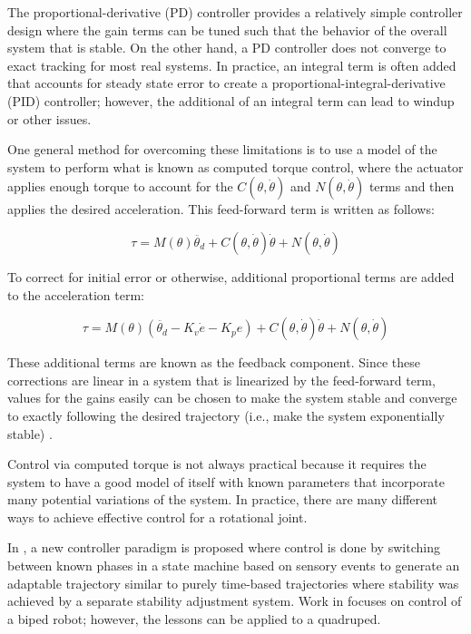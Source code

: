 The proportional-derivative (PD) controller provides a relatively simple controller design where the gain terms can be tuned such that the behavior of the overall system that is stable. On the other hand, a PD controller does not converge to
exact tracking for most real systems. In practice, an integral term is often added that accounts for steady state error to create a proportional-integral-derivative (PID) controller; however, the additional of an integral term can lead to windup or other issues.

One general method for overcoming these limitations is to use a model of the 
system to perform what is known as computed torque control, where the actuator
applies enough torque to account for the $C(\theta, \dot{\theta})$ and
$N(\theta, \dot{\theta})$ terms and then applies the desired acceleration. This feed-forward term is written as follows:

\begin{equation}
\tau = M(\theta) \ddot{\theta_{d}} + C(\theta, \dot{\theta}) \dot{\theta} + N(\theta, \dot{\theta})
\end{equation}

To correct for initial error or otherwise, additional proportional terms are
added to the acceleration term:

\begin{equation}
\tau = M(\theta) (\ddot{\theta_{d}} - K_{v} \dot{e} - K_{p} e) + C(\theta, \dot{\theta}) \dot{\theta} + N(\theta, \dot{\theta})
\end{equation}

These additional terms are known as the feedback component. Since these 
corrections are linear in a system that is linearized by the feed-forward term,
values for the gains easily can be chosen to make the system stable and converge
to exactly following the desired trajectory (i.e., make the system exponentially stable) \cite{MLS94}.

Control via computed torque 
is not always practical because it requires the system to have a good model of 
itself with known parameters that incorporate many potential variations of the
system. In practice, 
there are many different ways to achieve effective control for a rotational 
joint.


In \cite{EventBasedWalking}, a new controller paradigm is proposed where control
is done by switching between known phases in a state machine based on sensory
events to generate an adaptable trajectory similar to purely time-based
trajectories where stability was achieved by a separate stability adjustment
system. Work in \cite{EventBasedWalking} focuses on control of a biped robot; however, the lessons can
be applied to a quadruped.

